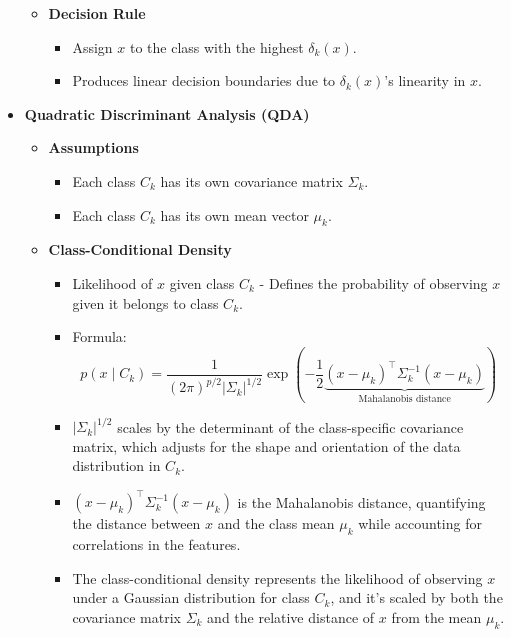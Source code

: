 \documentclass[12pt]{article}
\begin{document}
\begin{itemize}
\begin{itemize}
\begin{itemize}
        \end{itemize}
        \item \textbf{Decision Rule}
        \begin{itemize}
            \item Assign $x$ to the class with the highest $\delta_k(x)$.
            \item Produces linear decision boundaries due to $\delta_k(x)$'s linearity in $x$.
        \end{itemize}
    \end{itemize}

\item \textbf{Quadratic Discriminant Analysis (QDA)}
    \begin{itemize}
        \item \textbf{Assumptions}
        \begin{itemize}
            \item Each class $C_k$ has its own covariance matrix $\Sigma_k$.
            \item Each class $C_k$ has its own mean vector $\mu_k$.
        \end{itemize}
    \item \textbf{Class-Conditional Density}
    \begin{itemize}
        \item Likelihood of $x$ given class $C_k$ - Defines the probability of observing $x$ given it belongs to class $C_k$.
        \item Formula: 
        \[
        p(x \mid C_k) = \frac{1}{(2\pi)^{p/2} |\Sigma_k|^{1/2}} 
        \exp\left(-\frac{1}{2}\underbrace{(x-\mu_k)^\top \Sigma_k^{-1}(x-\mu_k)}_{\text{Mahalanobis distance}}\right)
        \]
        \item $|\Sigma_k|^{1/2}$ scales by the determinant of the class-specific covariance matrix, which adjusts for the shape and orientation of the data distribution in \(C_k\).
        \item $(x-\mu_k)^\top \Sigma_k^{-1}(x-\mu_k)$ is the Mahalanobis distance, quantifying the distance between $x$ and the class mean \(\mu_k\) while accounting for correlations in the features.
        \item The class-conditional density represents the likelihood of observing \(x\) under a Gaussian distribution for class \(C_k\), and it's scaled by both the covariance matrix \(\Sigma_k\) and the relative distance of \(x\) from the mean \(\mu_k\).
    \end{itemize}
    

\end{itemize}
\end{itemize}
\end{document}
